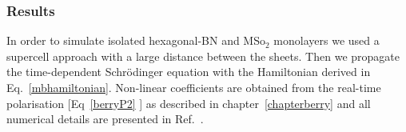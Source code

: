 


\subsubsection{Results}
In order to simulate isolated hexagonal-BN and MSo$_2$ monolayers we used a supercell approach with a large distance between the sheets. Then we propagate the time-dependent Schr\"odinger equation with the Hamiltonian derived in Eq.~\ref{mbhamiltonian}. Non-linear coefficients are obtained from the real-time polarisation [Eq~\ref{berryP2} ] as described in chapter~\ref{chapterberry} and all numerical details are presented in Ref.~\cite{PhysRevB.89.081102}. 

